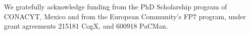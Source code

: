 \documentclass[journal]{IEEEtran}
\begin{document}
We gratefully acknowledge funding from the PhD Scholarship program of CONACYT, Mexico and from the European Community's FP7 program, under grant agreements 215181 CogX, and 600918 PaCMan.


\ifCLASSOPTIONcaptionsoff
  \newpage
\fi





%


%
% 
% 

% 
\end{document}
